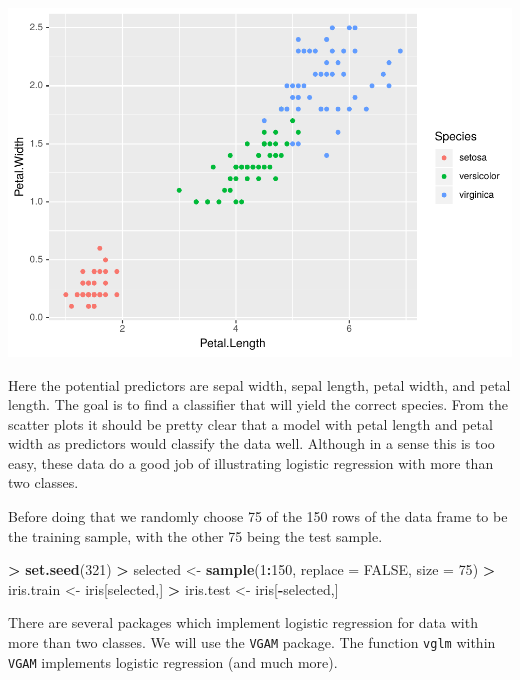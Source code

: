 \documentclass[
]{krantz}
\makeatletter
\newenvironment{Shaded}{\begin{snugshade}}{\end{snugshade}}
\newcommand{\DataTypeTok}[1]{\textcolor[rgb]{0.27,0.27,0.27}{#1}}
\newcommand{\DecValTok}[1]{\textcolor[rgb]{0.06,0.06,0.06}{#1}}
\newcommand{\KeywordTok}[1]{\textcolor[rgb]{0.27,0.27,0.27}{\textbf{#1}}}
\newcommand{\NormalTok}[1]{#1}
\newcommand{\OperatorTok}[1]{\textcolor[rgb]{0.43,0.43,0.43}{\textbf{#1}}}
\newcommand{\OtherTok}[1]{\textcolor[rgb]{0.37,0.37,0.37}{#1}}
\newcommand{\StringTok}[1]{\textcolor[rgb]{0.5,0.5,0.5}{#1}}
\newenvironment{kframe}{%
\medskip{}
\setlength{\fboxsep}{.8em}
 \def\at@end@of@kframe{}%
 \ifinner\ifhmode%
  \def\at@end@of@kframe{\end{minipage}}%
  \begin{minipage}{\columnwidth}%
 \fi\fi%
 \def\FrameCommand##1{\hskip\@totalleftmargin \hskip-\fboxsep
 \colorbox{shadecolor}{##1}\hskip-\fboxsep
     \hskip-\linewidth \hskip-\@totalleftmargin \hskip\columnwidth}%
 \MakeFramed {\advance\hsize-\width
   \@totalleftmargin\z@ \linewidth\hsize
   \@setminipage}}%
 {\par\unskip\endMakeFramed%
 \at@end@of@kframe}
\renewenvironment{Shaded}{\begin{kframe}}{\end{kframe}}
\makeatother
\begin{document}
\includegraphics{bookdown_files/figure-latex/unnamed-chunk-246-2.pdf}

Here the potential predictors are sepal width, sepal length, petal width, and petal length. The goal is to find a classifier that will yield the correct species. From the scatter plots it should be pretty clear that a model with petal length and petal width as predictors would classify the data well. Although in a sense this is too easy, these data do a good job of illustrating logistic regression with more than two classes.

Before doing that we randomly choose 75 of the 150 rows of the data frame to be the training sample, with the other 75 being the test sample.

\begin{Shaded}
\begin{Highlighting}[]
\OperatorTok{\textgreater{}}\StringTok{ }\KeywordTok{set.seed}\NormalTok{(}\DecValTok{321}\NormalTok{)}
\OperatorTok{\textgreater{}}\StringTok{ }\NormalTok{selected \textless{}{-}}\StringTok{ }\KeywordTok{sample}\NormalTok{(}\DecValTok{1}\OperatorTok{:}\DecValTok{150}\NormalTok{, }\DataTypeTok{replace =} \OtherTok{FALSE}\NormalTok{, }\DataTypeTok{size =} \DecValTok{75}\NormalTok{)}
\OperatorTok{\textgreater{}}\StringTok{ }\NormalTok{iris.train \textless{}{-}}\StringTok{ }\NormalTok{iris[selected,]}
\OperatorTok{\textgreater{}}\StringTok{ }\NormalTok{iris.test \textless{}{-}}\StringTok{ }\NormalTok{iris[}\OperatorTok{{-}}\NormalTok{selected,]}
\end{Highlighting}
\end{Shaded}

There are several packages which implement logistic regression for data with more than two classes. We will use the \texttt{VGAM} package. The function \texttt{vglm} within \texttt{VGAM} implements logistic regression (and much more).
\end{document}
